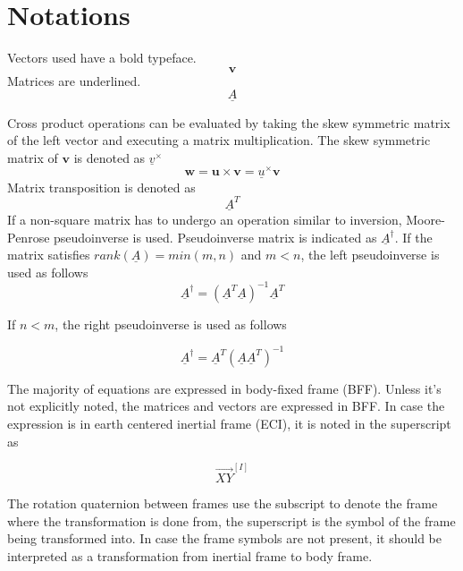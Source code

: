 \section*{Notations}

Vectors used have a bold typeface.  
\begin{equation*}
\textbf{v}
\end{equation*}
Matrices are underlined.
\begin{equation*}
\underline{A}
\end{equation*}

Cross product operations can be evaluated by taking the skew symmetric matrix of the left vector and executing a matrix multiplication. The skew symmetric matrix of $\textbf{v}$ is denoted as $\underline{v}^\times$
\begin{equation*}
	\textbf{w} = \textbf{u} \times \textbf{v} = \underline{u}^\times \textbf{v}
\end{equation*}
Matrix transposition is denoted as
\begin{equation*}
\underline{A}^T
\end{equation*}
If a non-square matrix has to undergo an operation similar to inversion, Moore-Penrose pseudoinverse is used. Pseudoinverse matrix is indicated as $\underline{A}^\dagger$. If the matrix satisfies $rank(\underline{A}) = min(m,n)$ and $m < n$, the left pseudoinverse is used as follows
\begin{equation*}
\underline{A}^\dagger    =   (\underline{A}^T \underline{A} )^{-1} \underline{A}^T 
\end{equation*}

If $n < m$, the right pseudoinverse is used as follows

\begin{equation*}
 \underline{A}^\dagger    =  \underline{A}^T  (\underline{A} \underline{A}^T)^{-1}
\end{equation*}


The majority of equations are expressed in body-fixed frame (BFF). Unless it's not explicitly noted, the matrices and vectors are expressed in BFF. In case the expression is in earth centered inertial frame (ECI), it is noted in the superscript as 

\begin{equation*}
\vec{XY}^{[I]}
\end{equation*}

The rotation quaternion between frames use the subscript to denote the frame where the transformation is done from, the superscript is the symbol of the frame being transformed into. In case the frame symbols are not present, it should be interpreted as a transformation from inertial frame to body frame.

